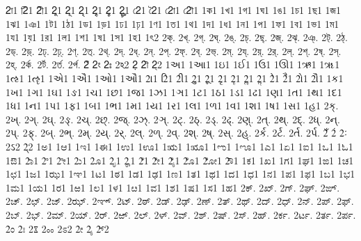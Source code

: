 {2া1
2ি1
2ী1
2ু1
2ূ1
2ৃ1
2ৄ1
2ৢ1
2ৣ1
2ে1
2ৈ1
2ো1
2ৌ1
1ক1
1খ1
1গ1
1ঘ1
1ঙ1
1চ1
1ছ1
1জ1
1ঝ1
1ঞ1
1ট1
1ঠ1
1ড1
1ড়1
1ঢ1
1ঢ়1
1ণ1
1ত1
1থ1
1দ1
1ধ1
1ন1
1প1
1ফ1
1ব1
1ভ1
1ম1
1য1
1য়1
1র1
1ল1
1শ1
1ষ1
1স1
1হ1
1ৎ2
2ক্.
2খ্.
2গ্.
2ঘ্.
2ঙ্.
2চ্.
2ছ্.
2জ্.
2ঝ্.
2ঞ্.
2ট্.
2ঠ্.
2ড্.
2ড়্.
2ঢ্.
2ঢ়্.
2ণ্.
2ত্.
2থ্.
2দ্.
2ধ্.
2ন্.
2প্.
2ফ্.
2ব্.
2ভ্.
2ম্.
2য্.
2য়্.
2র্.
2ল্.
2শ্.
2ষ্.
2স্.
2হ্.
2র্ক.
2র্ট.
2র্ত.
2র্প.
2ঁ
2ং
2ঃ
2ঽ2
2়
2ৗ
2্2
1અ1
1આ1
1ઇ1
1ઈ1
1ઉ1
1ઊ1
1ઋ1
1ૠ1
1ઌ1
1ૡ1
1એ1
1ઐ1
1ઓ1
1ઔ1
2ા1
2િ1
2ી1
2ુ1
2ૂ1
2ૃ1
2ૄ1
2ૢ1
2ૣ1
2ે1
2ૈ1
2ો1
2ૌ1
1ક1
1ખ1
1ગ1
1ઘ1
1ઙ1
1ચ1
1છ1
1જ1
1ઝ1
1ઞ1
1ટ1
1ઠ1
1ડ1
1ઢ1
1ણ1
1ત1
1થ1
1દ1
1ધ1
1ન1
1પ1
1ફ1
1બ1
1ભ1
1મ1
1ય1
1ર1
1લ1
1ળ1
1વ1
1શ1
1ષ1
1સ1
1હ1
2ક્.
2ખ્.
2ગ્.
2ઘ્.
2ઙ્.
2ચ્.
2છ્.
2જ્.
2ઝ્.
2ઞ્.
2ટ્.
2ઠ્.
2ડ્.
2ઢ્.
2ણ્.
2ત્.
2થ્.
2દ્.
2ધ્.
2ન્.
2પ્.
2ફ્.
2બ્.
2ભ્.
2મ્.
2ય્.
2ર્.
2લ્.
2ળ્.
2વ્.
2શ્.
2ષ્.
2સ્.
2હ્.
2ર્ક.
2ર્ટ.
2ર્ત.
2ર્પ.
2ઁ
2ં
2ઃ
2ઽ2
2્2
1ಅ1
1ಆ1
1ಇ1
1ಈ1
1ಉ1
1ಊ1
1ಋ1
1ೠ1
1ಌ1
1ೡ1
1ಎ1
1ಏ1
1ಐ1
1ಒ1
1ಓ1
1ಔ1
2ಾ1
2ಿ1
2ೀ1
2ು1
2ೂ1
2ೃ1
2ೄ1
2ೆ1
2ೇ1
2ೈ1
2ೊ1
2ೋ1
2ೌ1
1ಕ1
1ಖ1
1ಗ1
1ಘ1
1ಙ1
1ಚ1
1ಛ1
1ಜ1
1ಝ1
1ಞ1
1ಟ1
1ಠ1
1ಡ1
1ಢ1
1ಣ1
1ತ1
1ಥ1
1ದ1
1ಧ1
1ನ1
1ಪ1
1ಫ1
1ಬ1
1ಭ1
1ಮ1
1ಯ1
1ರ1
1ಱ1 %
1ಲ1
1ಳ1
1ೞ1 %
1ವ1
1ಶ1
1ಷ1
1ಸ1
1ಹ1
2ಕ್.
2ಖ್.
2ಗ್.
2ಘ್.
2ಙ್.
2ಚ್.
2ಛ್.
2ಜ್.
2ಝ್.
2ಞ್.
2ಟ್.
2ಠ್.
2ಡ್.
2ಢ್.
2ಣ್.
2ತ್.
2ಥ್.
2ದ್.
2ಧ್.
2ನ್.
2ಪ್.
2ಫ್.
2ಬ್.
2ಭ್.
2ಮ್.
2ಯ್.
2ರ್.
2ಱ್. %
2ಲ್.
2ಳ್.
2ವ್.
2ಶ್.
2ಷ್.
2ಸ್.
2ಹ್.
2ರ್ಕ.
2ರ್ಟ.
2ರ್ತ.
2ರ್ಪ.
2ಂ
2ಃ
2ೱ
2ೲ
2ಽ2
2ೕ
2ೖ
2್2
}
